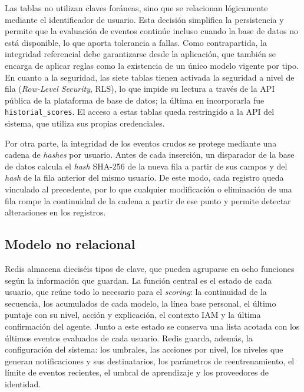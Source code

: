 Las tablas no utilizan claves foráneas, sino que se relacionan lógicamente mediante el identificador de usuario. Esta decisión simplifica la persistencia y permite que la evaluación de eventos continúe incluso cuando la base de datos no está disponible, lo que aporta tolerancia a fallas. Como contrapartida, la integridad referencial debe garantizarse desde la aplicación, que también se encarga de aplicar reglas como la existencia de un único modelo vigente por tipo. En cuanto a la seguridad, las siete tablas tienen activada la seguridad a nivel de fila (\emph{Row-Level Security}, RLS), lo que impide su lectura a través de la API pública de la plataforma de base de datos; la última en incorporarla fue \texttt{historial\_scores}. El acceso a estas tablas queda restringido a la API del sistema, que utiliza sus propias credenciales.

Por otra parte, la integridad de los eventos crudos se protege mediante una cadena de \emph{hashes} por usuario. Antes de cada inserción, un disparador de la base de datos calcula el \emph{hash} SHA-256 de la nueva fila a partir de sus campos y del \emph{hash} de la fila anterior del mismo usuario. De este modo, cada registro queda vinculado al precedente, por lo que cualquier modificación o eliminación de una fila rompe la continuidad de la cadena a partir de ese punto y permite detectar alteraciones en los registros.

\FloatBarrier
\subsection{Modelo no relacional}
Redis almacena dieciséis tipos de clave, que pueden agruparse en ocho funciones según la información que guardan. La función central es el estado de cada usuario, que reúne todo lo necesario para el \emph{scoring}: la continuidad de la secuencia, los acumulados de cada modelo, la línea base personal, el último puntaje con su nivel, acción y explicación, el contexto IAM y la última confirmación del agente. Junto a este estado se conserva una lista acotada con los últimos eventos evaluados de cada usuario. Redis guarda, además, la configuración del sistema: los umbrales, las acciones por nivel, los niveles que generan notificaciones y sus destinatarios, los parámetros de reentrenamiento, el límite de eventos recientes, el umbral de aprendizaje y los proveedores de identidad.

